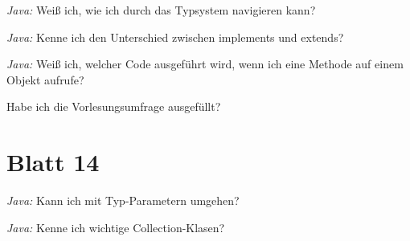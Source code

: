 \documentclass{article}
\newcommand*{\thecheckbox}{\hss[\hss]}
\newenvironment*{checklist} 
{\list{}{\itemsep -2pt 
\renewcommand*{\makelabel}[1]{\thecheckbox}}} 
{\endlist}
\begin{document}
\begin{checklist}
  \item \emph{Java:} Weiß ich, wie ich durch das Typsystem navigieren kann?
  \item \emph{Java:} Kenne ich den Unterschied zwischen implements und extends?
  \item \emph{Java:} Weiß ich, welcher Code ausgeführt wird, wenn ich eine Methode auf einem Objekt aufrufe?
  \item Habe ich die Vorlesungsumfrage ausgefüllt?
\end{checklist}

\section{Blatt 14}

\begin{checklist}
  \item \emph{Java:} Kann ich mit Typ-Parametern umgehen?
  \item \emph{Java:} Kenne ich wichtige Collection-Klasen?
\end{checklist}
\end{document}
